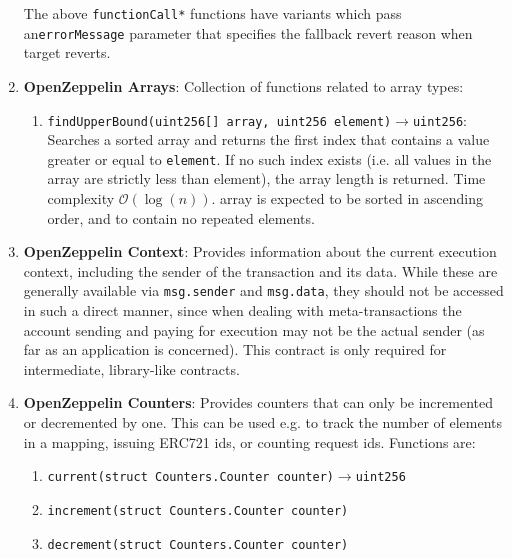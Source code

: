 \begin{enumerate}
The above \verb|functionCall*| functions have variants which pass an\linebreak\verb|errorMessage| parameter that specifies the fallback revert reason when target reverts.

\item\textbf{OpenZeppelin Arrays}: Collection of functions related to array types:
	\begin{enumerate}
	\item \verb|findUpperBound(uint256[] array, uint256 element)|$\rightarrow$\verb|uint256|: Searches a sorted array and returns the first index that contains a value greater or equal to \verb|element|. If no such index exists (i.e. all values in the array are strictly less than element), the array length is returned. Time complexity $\mathcal{O}(\log(n))$. array is expected to be sorted in ascending order, and to contain no repeated elements.
	\end{enumerate}

\item\textbf{OpenZeppelin Context}: Provides information about the current execution context, including the sender of the transaction and its data. While these are generally available via \verb|msg.sender| and \verb|msg.data|, they should not be accessed in such a direct manner, since when dealing with meta-transactions the account sending and paying for execution may not be the actual sender (as far as an application is concerned). This contract is only required for intermediate, library-like contracts.

\item\textbf{OpenZeppelin Counters}: Provides counters that can only be incremented or decremented by one. This can be used e.g. to track the number of elements in a mapping, issuing ERC721 ids, or counting request ids. Functions are:
	\begin{enumerate}
	\item\verb|current(struct Counters.Counter counter)|$\rightarrow$\verb|uint256|
	\item\verb|increment(struct Counters.Counter counter)|
	\item\verb|decrement(struct Counters.Counter counter)|
	\end{enumerate}


\end{enumerate}

